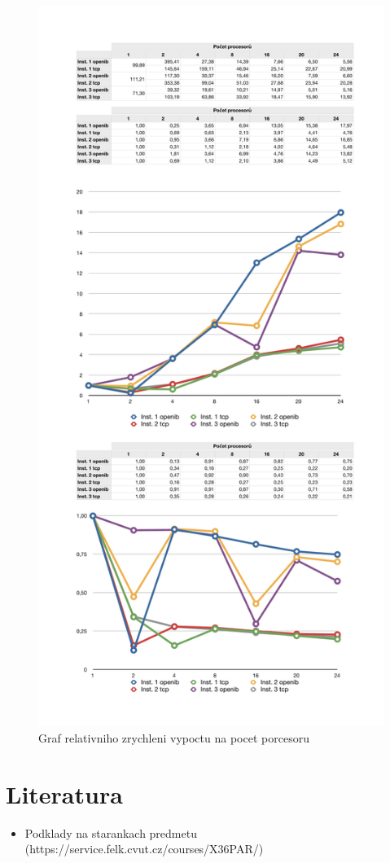 \documentclass[a4paper]{article}
\begin{document}
\begin{figure}[ht]
\centerline{\includegraphics[width=\textwidth]{graph-per-cpu.pdf}}
\caption{Graf relativniho zrychleni vypoctu na pocet porcesoru}
\label{graph-per-cpu}
\end{figure}

\section{Literatura}

\begin{itemize}
	\item Podklady na starankach predmetu (https://service.felk.cvut.cz/courses/X36PAR/)
\end{itemize}
\end{document}
